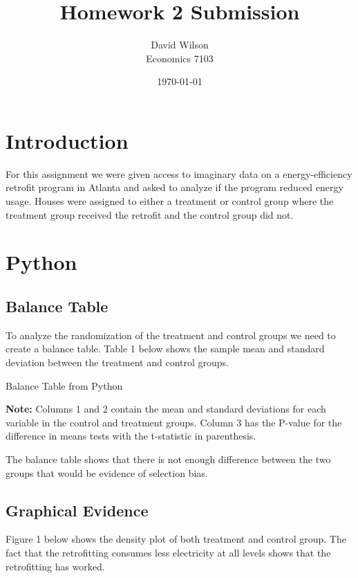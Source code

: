 \documentclass{article}
\title{Homework 2 Submission}
\author{David Wilson \\ Economics 7103}
\date{\today}
\begin{document}
  
\maketitle

\section*{Introduction}

For this assignment we were given access to imaginary data on a energy-efficiency retrofit program in Atlanta and asked to analyze if the program reduced energy usage. Houses were assigned to either a treatment or control group where the treatment group received the retrofit and the control group did not.

\section{Python}
    \subsection{Balance Table} 
    To analyze the randomization of the treatment and control groups we need to create a balance table. Table 1 below shows the sample mean and standard deviation between the treatment and control groups.\

\begin{table}[h]
    \centering
    \begin{threeparttable}
    \caption{Balance Table from Python}
        
        \begin{tablenotes}
          \small \item \textbf{Note:} Columns 1 and 2 contain the mean and standard deviations for each variable in the control and treatment groups. Column 3 has the P-value for the difference in means tests with the t-statistic in parenthesis.  
        \end{tablenotes}
    \end{threeparttable}
\end{table}

The balance table shows that there is not enough difference between the two groups that would be evidence of selection bias. 

\subsection{Graphical Evidence}

Figure 1 below shows the density plot of both treatment and control group. The fact that the retrofitting consumes less electricity at all levels shows that the retrofitting has worked.
\end{document}
